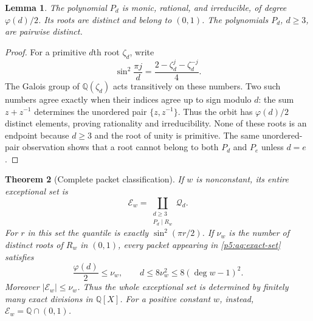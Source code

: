 \documentclass[11pt,a4paper]{article}
\newtheorem{theorem}{Theorem}[section]
\newtheorem{lemma}[theorem]{Lemma}
\theoremstyle{definition}
\theoremstyle{remark}
\numberwithin{equation}{section}
\begin{document}
\begin{lemma}\label{p5:aq:cyclotomic}
The polynomial $P_d$ is monic, rational, and irreducible, of
degree $\varphi(d)/2$. Its roots are distinct and belong to $(0,1)$.
The polynomials $P_d$, $d\ge3$, are pairwise distinct.
\end{lemma}

\begin{proof}
For a primitive $d$th root $\zeta_d$, write
\[
 \sin^2\frac{\pi j}{d}
       =\frac{2-\zeta_d^j-\zeta_d^{-j}}4.
\]
The Galois group of $\mathbb Q(\zeta_d)$ acts transitively on
these numbers. Two such numbers agree exactly when their indices
agree up to sign modulo $d$: the sum
$z+z^{-1}$ determines the unordered pair $\{z,z^{-1}\}$.
Thus the orbit has $\varphi(d)/2$ distinct elements, proving
rationality and irreducibility. None of these roots is an endpoint
because $d\ge3$ and the root of unity is primitive.
The same unordered-pair observation shows that a root cannot
belong to both $P_d$ and $P_e$ unless $d=e$.
\end{proof}

\begin{theorem}[Complete packet classification]\label{p5:aq:classification}
If $w$ is nonconstant, its entire exceptional set is
\begin{equation}\label{p5:aq:exact-set}
 \mathcal E_w
   =\coprod_{\substack{d\ge3\\P_d\mid R_w}}\mathcal Q_d.
\end{equation}
For $r$ in this set the quantile is exactly
$\sin^2(\pi r/2)$. If $\nu_w$ is the number of distinct roots of
$R_w$ in $(0,1)$, every packet appearing in \eqref{p5:aq:exact-set}
satisfies
\begin{equation}\label{p5:aq:order-bound}
 \frac{\varphi(d)}2\le\nu_w,\qquad
 d\le8\nu_w^2\le8(\deg w-1)^2.
\end{equation}
Moreover $|\mathcal E_w|\le\nu_w$.
Thus the whole exceptional set is determined by finitely many
exact divisions in $\mathbb Q[X]$.
For a positive constant $w$, instead,
$\mathcal E_w=\mathbb Q\cap(0,1)$.
\end{theorem}
\end{document}
